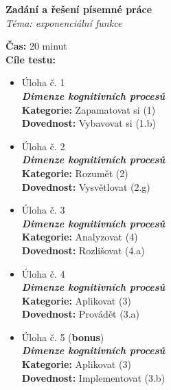 \centering\Large\textbf{Zadání a řešení písemné práce}\\
\centering\normalsize\textit{Téma: exponenciální funkce}

\raggedright
\textbf{Čas:} 20 minut\\
\textbf{Cíle testu:}
\noindent
\begin{itemize}[topsep=0pt]
  \item Úloha č. 1\\
        \textbf{\textit{Dimenze kognitivních procesů}}\\
        \textbf{Kategorie:} Zapamatovat si (1)\\
        \textbf{Dovednost:} Vybavovat si (1.b)
  \item Úloha č. 2\\
        \textbf{\textit{Dimenze kognitivních procesů}}\\
        \textbf{Kategorie:} Rozumět (2)\\
        \textbf{Dovednost:} Vysvětlovat (2.g)
  \item Úloha č. 3\\
        \textbf{\textit{Dimenze kognitivních procesů}}\\
        \textbf{Kategorie:} Analyzovat (4)\\
        \textbf{Dovednost:} Rozlišovat (4.a)
  \item Úloha č. 4\\
        \textbf{\textit{Dimenze kognitivních procesů}}\\
        \textbf{Kategorie:} Aplikovat (3)\\
        \textbf{Dovednost:} Provádět (3.a)
  \item Úloha č. 5 (\textbf{bonus})\\
        \textbf{\textit{Dimenze kognitivních procesů}}\\
        \textbf{Kategorie:} Aplikovat (3)\\
        \textbf{Dovednost:} Implementovat (3.b)


\end{itemize}

